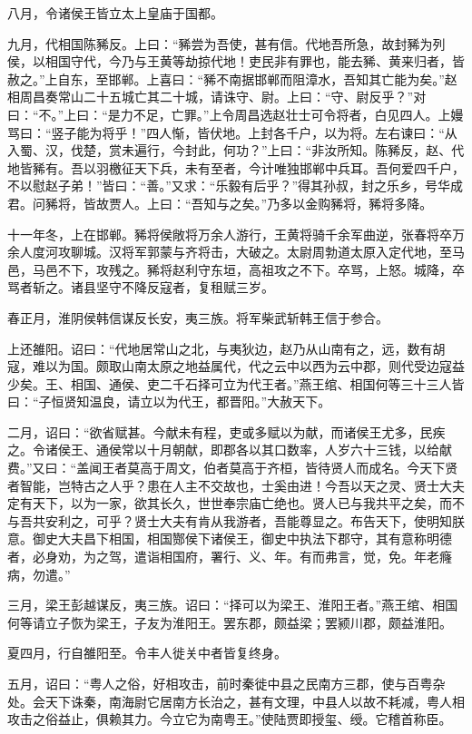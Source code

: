 \documentclass[]{article}
\begin{document}
八月，令诸侯王皆立太上皇庙于国都。

九月，代相国陈豨反。上曰：``豨尝为吾使，甚有信。代地吾所急，故封豨为列侯，以相国守代，今乃与王黄等劫掠代地！吏民非有罪也，能去豨、黄来归者，皆赦之。''上自东，至邯郸。上喜曰：``豨不南据邯郸而阻漳水，吾知其亡能为矣。''赵相周昌奏常山二十五城亡其二十城，请诛守、尉。上曰：``守、尉反乎？''对曰：``不。''上曰：``是力不足，亡罪。''上令周昌选赵壮士可令将者，白见四人。上嫚骂曰：``竖子能为将乎！''四人惭，皆伏地。上封各千户，以为将。左右谏曰：``从入蜀、汉，伐楚，赏未遍行，今封此，何功？''上曰：``非汝所知。陈豨反，赵、代地皆豨有。吾以羽檄征天下兵，未有至者，今计唯独邯郸中兵耳。吾何爱四千户，不以慰赵子弟！''皆曰：``善。''又求：``乐毅有后乎？''得其孙叔，封之乐乡，号华成君。问豨将，皆故贾人。上曰：``吾知与之矣。''乃多以金购豨将，豨将多降。

十一年冬，上在邯郸。豨将侯敞将万余人游行，王黄将骑千余军曲逆，张春将卒万余人度河攻聊城。汉将军郭蒙与齐将击，大破之。太尉周勃道太原入定代地，至马邑，马邑不下，攻残之。豨将赵利守东垣，高祖攻之不下。卒骂，上怒。城降，卒骂者斩之。诸县坚守不降反寇者，复租赋三岁。

春正月，淮阴侯韩信谋反长安，夷三族。将军柴武斩韩王信于参合。

上还雒阳。诏曰：``代地居常山之北，与夷狄边，赵乃从山南有之，远，数有胡寇，难以为国。颇取山南太原之地益属代，代之云中以西为云中郡，则代受边寇益少矣。王、相国、通侯、吏二千石择可立为代王者。''燕王绾、相国何等三十三人皆曰：``子恒贤知温良，请立以为代王，都晋阳。''大赦天下。

二月，诏曰：``欲省赋甚。今献未有程，吏或多赋以为献，而诸侯王尤多，民疾之。令诸侯王、通侯常以十月朝献，即郡各以其口数率，人岁六十三钱，以给献费。''又曰：``盖闻王者莫高于周文，伯者莫高于齐桓，皆待贤人而成名。今天下贤者智能，岂特古之人乎？患在人主不交故也，士奚由进！今吾以天之灵、贤士大夫定有天下，以为一家，欲其长久，世世奉宗庙亡绝也。贤人已与我共平之矣，而不与吾共安利之，可乎？贤士大夫有肯从我游者，吾能尊显之。布告天下，使明知朕意。御史大夫昌下相国，相国酂侯下诸侯王，御史中执法下郡守，其有意称明德者，必身劝，为之驾，遣诣相国府，署行、义、年。有而弗言，觉，免。年老癃病，勿遣。''

三月，梁王彭越谋反，夷三族。诏曰：``择可以为梁王、淮阳王者。''燕王绾、相国何等请立子恢为梁王，子友为淮阳王。罢东郡，颇益梁；罢颍川郡，颇益淮阳。

夏四月，行自雒阳至。令丰人徙关中者皆复终身。

五月，诏曰：``粤人之俗，好相攻击，前时秦徙中县之民南方三郡，使与百粤杂处。会天下诛秦，南海尉它居南方长治之，甚有文理，中县人以故不耗减，粤人相攻击之俗益止，俱赖其力。今立它为南粤王。''使陆贾即授玺、绶。它稽首称臣。
\end{document}
